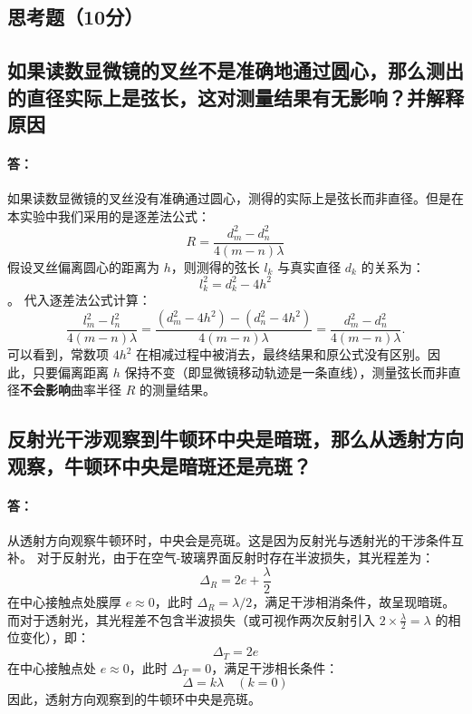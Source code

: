 \documentclass[]{../../templates/Report}%
\begin{document}
\begin{fullreportonly}
\section{思考题（10分）}
\subsection{如果读数显微镜的叉丝不是准确地通过圆心，那么测出的直径实际上是弦长，这对测量结果有无影响？并解释原因}
\paragraph{答：}如果读数显微镜的叉丝没有准确通过圆心，测得的实际上是弦长而非直径。但是在本实验中我们采用的是逐差法公式：
\[R = \frac{d_m^2 - d_n^2}{4(m-n)\lambda}\]
假设叉丝偏离圆心的距离为 $h$，则测得的弦长 $l_k$ 与真实直径 $d_k$ 的关系为：
\[l_k^2 = d_k^2 - 4h^2\]。
代入逐差法公式计算：
\[
\frac{l_m^2 - l_n^2}{4(m-n)\lambda} = \frac{(d_m^2 - 4h^2) - (d_n^2 - 4h^2)}{4(m-n)\lambda} = \frac{d_m^2 - d_n^2}{4(m-n)\lambda}.
\]
可以看到，常数项 $4h^2$ 在相减过程中被消去，最终结果和原公式没有区别。因此，只要偏离距离 $h$ 保持不变（即显微镜移动轨迹是一条直线），测量弦长而非直径\textbf{不会影响}曲率半径 $R$ 的测量结果。

\subsection{反射光干涉观察到牛顿环中央是暗斑，那么从透射方向观察，牛顿环中央是暗斑还是亮斑？}
\paragraph{答：}从透射方向观察牛顿环时，中央会是亮斑。这是因为反射光与透射光的干涉条件互补。
对于反射光，由于在空气-玻璃界面反射时存在半波损失，其光程差为：
\[ \Delta_R = 2e + \frac{\lambda}{2} \]
在中心接触点处膜厚 $e \approx 0$，此时 $\Delta_R = \lambda/2$，满足干涉相消条件，故呈现暗斑。
而对于透射光，其光程差不包含半波损失（或可视作两次反射引入 $2 \times \frac{\lambda}{2} = \lambda$ 的相位变化），即：
\[ \Delta_T = 2e \]
在中心接触点处 $e \approx 0$，此时 $\Delta_T = 0$，满足干涉相长条件：
\[ \Delta = k\lambda \quad (k=0) \]
因此，透射方向观察到的牛顿环中央是亮斑。
\end{fullreportonly}
\insertnotes
\end{document}
